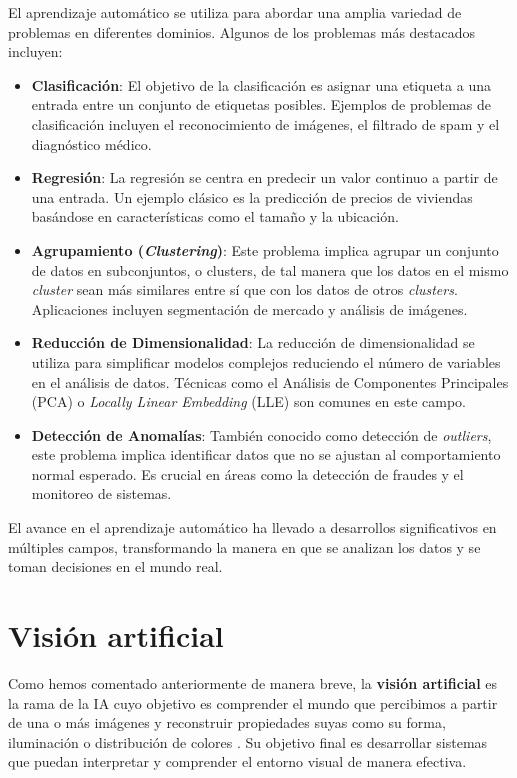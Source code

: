 El aprendizaje automático se utiliza para abordar una amplia variedad de problemas en diferentes dominios. Algunos de los problemas más destacados incluyen:

\begin{itemize}
	\item \textbf{Clasificación}: El objetivo de la clasificación es asignar una etiqueta a una entrada entre un conjunto de etiquetas posibles. Ejemplos de problemas de clasificación incluyen el reconocimiento de imágenes, el filtrado de spam y el diagnóstico médico.
	
	\item \textbf{Regresión}: La regresión se centra en predecir un valor continuo a partir de una entrada. Un ejemplo clásico es la predicción de precios de viviendas basándose en características como el tamaño y la ubicación.
	
	\item \textbf{Agrupamiento (\textit{Clustering})}: Este problema implica agrupar un conjunto de datos en subconjuntos, o clusters, de tal manera que los datos en el mismo \textit{cluster} sean más similares entre sí que con los datos de otros \textit{clusters}. Aplicaciones incluyen segmentación de mercado y análisis de imágenes.
	
	\item \textbf{Reducción de Dimensionalidad}: La reducción de dimensionalidad se utiliza para simplificar modelos complejos reduciendo el número de variables en el análisis de datos. Técnicas como el Análisis de Componentes Principales (PCA) o \textit{Locally Linear Embedding} (LLE) son comunes en este campo.
	
	\item \textbf{Detección de Anomalías}: También conocido como detección de \textit{outliers}, este problema implica identificar datos que no se ajustan al comportamiento normal esperado. Es crucial en áreas como la detección de fraudes y el monitoreo de sistemas.
\end{itemize}

El avance en el aprendizaje automático ha llevado a desarrollos significativos en múltiples campos, transformando la manera en que se analizan los datos y se toman decisiones en el mundo real.

\section{Visión artificial}

Como hemos comentado anteriormente de manera breve, la \textbf{visión artificial} es la rama de la IA cuyo objetivo es comprender el mundo que percibimos a partir de una o más imágenes y reconstruir propiedades suyas como su forma, iluminación o distribución de colores \cite{szeliski2022computer}. Su objetivo final es desarrollar sistemas que puedan interpretar y comprender el entorno visual de manera efectiva.

